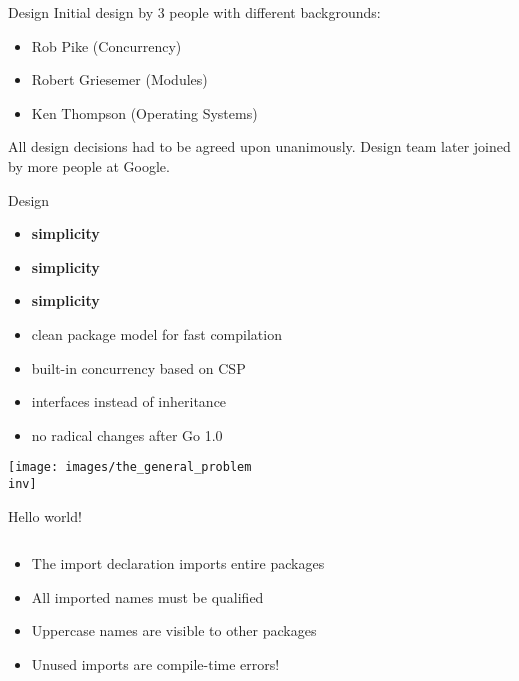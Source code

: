 \documentclass[10pt]{beamer}
\newcommand{\inv}{-inv}
\begin{document}
	\begin{frame}{Design}
		Initial design by 3 people with different backgrounds:
		\begin{itemize}
			\item Rob Pike (Concurrency)
			\item Robert Griesemer (Modules)
			\item Ken Thompson (Operating Systems)
		\end{itemize}
		All design decisions had to be agreed upon unanimously.
		Design team later joined by more people at Google.
	\end{frame}
	
	
	\begin{frame}{Design}
		\begin{itemize}
			\item \textbf{simplicity}
			\item \textbf{simplicity}
			\item \textbf{simplicity}
			\item clean package model for fast compilation
			\item built-in concurrency based on CSP
			\item interfaces instead of inheritance
			\item no radical changes after Go 1.0
		\end{itemize}
	\end{frame}
	
	
	\begin{frame}
		\begin{center}
			\texttt{[image: images/the\_general\_problem\\inv]}
		\end{center}
	\end{frame}
	
	
	\begin{frame}[fragile]{Hello world!}
		\inputminted{go}{code/01_hello.go}
		\vspace*{-4ex}
		\begin{itemize}
			\item The import declaration imports entire packages
			\item All imported names must be qualified
			\item Uppercase names are visible to other packages
			\item Unused imports are compile-time errors!
		\end{itemize}
\end{frame}
	
\end{document}
